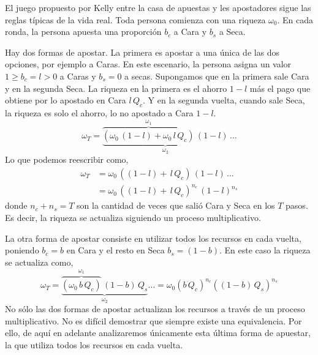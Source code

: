 \documentclass[a4paper,10pt]{book}
\theoremstyle{definition}1
\begin{document}

El juego propuesto por Kelly entre la casa de apuestas y les apostadores sigue las reglas típicas de la vida real.
%
Toda persona comienza con una riqueza $\omega_0$.
%
En cada ronda, la persona apuesta una proporción $b_c$ a Cara y $b_s$ a Seca.


Hay dos formas de apostar.
%
La primera es apostar a una única de las dos opciones, por ejemplo a Caras.
%
En este escenario, la persona asigna un valor $ 1 \geq b_c = l > 0 $ a Caras y $b_s = 0$ a secas.
%
Supongamos que en la primera sale Cara y en la segunda Seca.
%
La riqueza en la primera es el ahorro $1-l$ más el pago que obtiene por lo apostado en Cara $l \, Q_c$.
%
Y en la segunda vuelta, cuando sale Seca, la riqueza es solo el ahorro, lo no apostado a Cara $1-l$.
%
\begin{equation}
\omega_T = \underbrace{\overbrace{(\omega_0 \, (1-l) + \omega_0 \, l \, Q_c )}^{\omega_1} \, (1-l)}_{\omega_2} \,\dots
\end{equation}
%
Lo que podemos reescribir como,
%
\begin{equation}
\begin{split}
\omega_T &= \omega_0 \, ((1-l) + \, l \, Q_c ) \, (1-l) \, \dots \\
 &= \omega_0 \, ( (1-l) + \, l \, Q_c )^{n_c} \, (1-l)^{n_s} 
\end{split}
\end{equation}
%
donde $n_c + n_s = T$ son la cantidad de veces que salió Cara y Seca en los $T$ pasos.
%
Es decir, la riqueza se actualiza siguiendo un proceso multiplicativo.


La otra forma de apostar consiste en utilizar todos los recursos en cada vuelta, poniendo $b_c = b$ en Cara y el resto en Seca $b_s = (1-b)$.
%
En este caso la riqueza se actualiza como,
%
\begin{equation} \label{eq:kelly_paraconsistente}
\omega_T = \underbrace{\overbrace{(\omega_0 \, b \, Q_c)}^{\omega_1} \,  (1-b) \, Q_s}_{\omega_2} \dots = \omega_0 (b \, Q_c)^{n_c} ((1-b) \, Q_s )^{n_s}
\end{equation}
%
No sólo las dos formas de apostar actualizan los recursos a través de un proceso multiplicativo. 
%
No es difícil demostrar que siempre existe una equivalencia.
%
Por ello, de aquí en adelante analizaremos únicamente esta última forma de apuestar, la que utiliza todos los recursos en cada vuelta.
\end{document}

